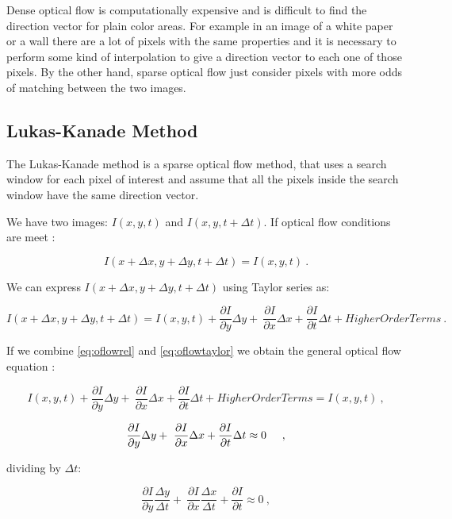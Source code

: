 Dense optical flow is computationally expensive and is difficult to find the direction vector 
for plain color areas. For example in an image of a white paper or a wall
there are a lot of pixels with the same properties and it is necessary to perform some kind of interpolation to give a direction vector
 to each one of those pixels. 
By the other hand, sparse optical flow just consider pixels with more odds of matching between the two images.

\subsection{Lukas-Kanade Method}
\label{sec:oflow}

The Lukas-Kanade method is a sparse optical flow method, that 
uses a search window for each pixel of interest and assume that all the pixels 
inside the search window have the same direction vector.


We have two images: $I(x,y,t)$ and $I(x,y,t+\Delta t)$.
If optical flow conditions are meet :

\begin{equation}
\label{eq:oflowrel}
I(x + \Delta x,y + \Delta y, t + \Delta t) = I(x,y,t)\ .
\end{equation}

We can express $I(x + \Delta x, y + \Delta y, t + \Delta t)$ using Taylor series as:

\begin{equation}
\label{eq:oflowtaylor}
I(x + \Delta x, y + \Delta y, t + \Delta t) = I(x,y,t) + \frac{\partial I}{\partial y} \Delta y + \
 \frac{\partial I}{\partial x} \Delta x  + \frac{\partial I}{\partial t} \Delta t + Higher Order Terms \ .
\end{equation}

If we combine \ref{eq:oflowrel} and \ref{eq:oflowtaylor} we obtain the general optical flow equation :


$$ I(x,y,t) + \frac{\partial I}{\partial y} \Delta y + \
 \frac{\partial I}{\partial x} \Delta x  + \frac{\partial I}{\partial t} \Delta t + Higher Order Terms = I(x,y,t)\ , $$


$$ \frac{\partial I}{\partial y} \Delta y + \
 \frac{\partial I}{\partial x} \Delta x  + \frac{\partial I}{\partial t} \Delta t \approx 0 \hspace{0.5cm},  $$

\noindent dividing by $\Delta t$:

$$ \frac{\partial I}{\partial y} \frac{\Delta y}{\Delta t} + \
 \frac{\partial I}{\partial x} \frac{\Delta x}{\Delta t}  + \frac{\partial I}{\partial t}  \approx 0 \ , $$


